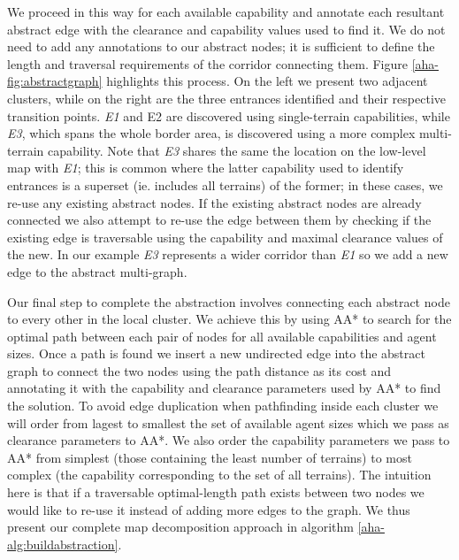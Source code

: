 We proceed in this way for each available capability and annotate each resultant abstract edge with the clearance and capability values used to find it. We do not need to add any annotations to our abstract nodes; it is sufficient to define the length and traversal requirements of the corridor connecting them.  Figure \ref{aha-fig:abstractgraph} highlights this process. On the left we present two adjacent clusters, while on the right are the three entrances identified and their respective transition points. \emph{E1} and {E2} are discovered using single-terrain capabilities, while \emph{E3}, which spans the whole border area, is discovered using a more complex multi-terrain capability. Note that \emph{E3} shares the same the location on the low-level map with \emph{E1}; this is common where the latter capability used to identify entrances is a superset (ie. includes all terrains) of the former; in these cases, we re-use any existing abstract nodes. If the existing abstract nodes are already connected we also attempt to re-use the edge between them by checking if the existing edge is traversable using the capability and maximal clearance values of the new. In our example \emph{E3} represents a wider corridor than \emph{E1} so we add a new edge to the abstract multi-graph. \\ \newline

Our final step to complete the abstraction involves connecting each abstract node to every other in the local cluster. We achieve this by using AA* to search for the optimal path between each pair of nodes for all available capabilities and agent sizes. Once a path is found we insert a new undirected edge into the abstract graph to connect the two nodes using the path distance as its cost and annotating it with the capability and clearance parameters used by AA* to find the solution. To avoid edge duplication when pathfinding inside each  cluster we will order from lagest to smallest the set of available agent sizes which we pass as clearance parameters to AA*. We also order the capability parameters we pass to AA* from simplest (those containing the least number of terrains) to most complex (the capability corresponding to the set of all terrains). The intuition here is that if a traversable optimal-length path exists between two nodes we would like to re-use it instead of adding more edges to the graph. We thus present our complete map decomposition approach in  algorithm \ref{aha-alg:buildabstraction}.



